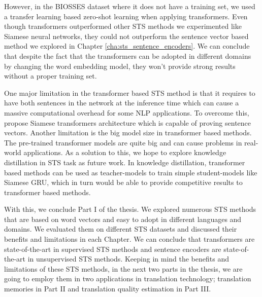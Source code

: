 However, in the BIOSSES dataset where it does not have a training set, we used a transfer learning based zero-shot learning when applying transformers. Even though transformers outperformed other STS methods we experimented like Siamese neural networks, they could not outperform the sentence vector based method we explored in Chapter \ref{cha:sts_sentence_encoders}. We can conclude that despite the fact that the transformers can be adopted in different domains by changing the word embedding model, they won't provide strong results without a proper training set. 

One major limitation in the transformer based STS method is that it requires to have both sentences in the network at the inference time which can cause a massive computational overhead for some NLP applications. To overcome this, \autocite{reimers-gurevych-2019-sentence} propose Siamese transformers architecture which is capable of proving sentence vectors. Another limitation is the big model size in transformer based methods. The pre-trained transformer models are quite big and can cause problems in real-world applications. As a solution to this, we hope to explore knowledge distillation \autocite{Gou2021} in STS task as future work. In knowledge distillation, transformer based methods can be used as teacher-models to train simple student-models like Siamese GRU, which in turn would be able to provide competitive results to transformer based methods. 

With this, we conclude Part I of the thesis. We explored numerous STS methods that are based on word vectors and easy to adopt in different languages and domains. We evaluated them on different STS datasets and discussed their benefits and limitations in each Chapter. We can conclude that transformers are state-of-the-art in supervised STS methods and sentence encoders are state-of-the-art in unsupervised STS methods. Keeping in mind the benefits and limitations of these STS methods, in the next two parts in the thesis, we are going to employ them in two applications in translation technology; translation memories in Part II and translation quality estimation in Part III.

